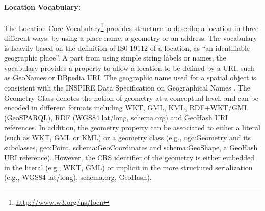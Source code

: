 \paragraph{Location Vocabulary:}
The Location Core Vocabulary\footnote{\url{http://www.w3.org/ns/locn}} provides structure to describe a location in three different ways: by using a place name, a geometry or an address. The vocabulary is heavily based on the definition of IS0 19112 of a location, as ``an identifiable geographic place''. A part from using simple string labels or names, the vocabulary provides a property to allow a location to be defined by a URI, such as GeoNames or DBpedia URI. The geographic name used for a spatial object is consistent with the INSPIRE Data Specification on Geographical Names \cite{inspire2009}. The Geometry Class denotes the notion of geometry at a conceptual level, and can be encoded in different formats including WKT, GML, KML, RDF+WKT/GML (GeoSPARQL), RDF (WGS84 lat/long, schema.org) and GeoHash URI references. In addition, 
the geometry property can be associated to either a literal (such as WKT, GML or KML) or a geometry class (e.g., ogc:Geometry and its subclasses, geo:Point, schema:GeoCoordinates and schema:GeoShape, a GeoHash URI reference). However, the CRS identifier of the geometry is either embedded in the literal (e.g., WKT, GML) or implicit in the more structured serialization (e.g., WGS84 lat/long), schema.org, GeoHash).


